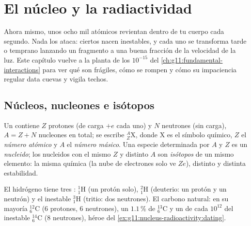 \chapter{El núcleo y la radiactividad}\label{ch:g11:nucleus-radioactivity}

Ahora mismo, unos ocho mil  atómicos revientan dentro de tu
cuerpo cada segundo. Nada los ataca: ciertos  nacen inestables, y
cada uno se transforma tarde o temprano lanzando un fragmento a una
buena fracción de la velocidad de la luz. Este capítulo vuelve a la
planta de los $10^{-15}$  del
\cref{ch:g11:fundamental-interactions} para ver qué  son
frágiles, cómo se rompen y cómo su impaciencia regular data cuevas y
vigila techos.

\section{Núcleos, nucleones e isótopos}

\begin{definition}\label{def:g11:nucleus-radioactivity:notation}
Un  contiene $Z$ protones (de carga $+e$ cada uno) y $N$ neutrones
(sin carga), $A = Z + N$ nucleones en total; se escribe
${}^{A}_{Z}\mathrm{X}$, donde $\mathrm X$ es el símbolo químico, $Z$ el
\emph{número atómico} y $A$ el \emph{número
másico}. Una especie determinada por $A$ y $Z$ es
un \emph{nucleido}; los nucleidos con el mismo $Z$ y
distinto $A$ son \emph{isótopos} de un mismo elemento:
la misma química (la nube de electrones solo ve $Ze$), distinto  y
distinta estabilidad.
\end{definition}

\begin{example}\label{ex:g11:nucleus-radioactivity:hc}
El hidrógeno tiene tres : ${}^{1}_{1}\mathrm{H}$ (un protón
solo), ${}^{2}_{1}\mathrm{H}$ (deuterio: un protón y un neutrón) y el
inestable ${}^{3}_{1}\mathrm{H}$ (tritio: dos neutrones). El carbono
natural: en su mayoría ${}^{12}_{6}\mathrm{C}$ ($6$ protones, $6$
neutrones), un $1.1\,\%$ de ${}^{13}_{6}\mathrm{C}$ y un  de cada
$10^{12}$ del inestable ${}^{14}_{6}\mathrm{C}$ ($8$ neutrones), héroe
del \cref{ex:g11:nucleus-radioactivity:dating}.
\end{example}

